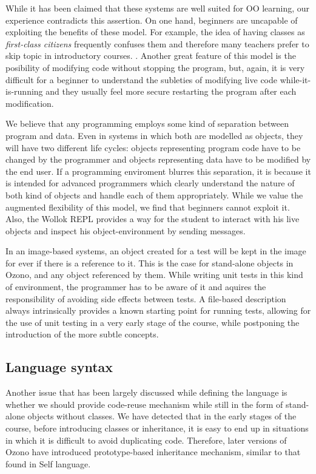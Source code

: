 While it has been claimed that these systems are well suited for OO learning, our experience contradicts this assertion.
On one hand, beginners are uncapable of exploiting the benefits of these model. 
For example, the idea of having classes as \emph{first-class citizens} frequently confuses them and therefore many teachers prefer to skip topic in introductory courses. .
Another great feature of this model is the posibility of modifying code without stopping the program, 
but, again, it is very difficult for a beginner to understand the subleties of modifying live code while-it-is-running 
and they usually feel more secure restarting the program after each modification.

We believe that any programming employs some kind of separation between program and data. 
Even in systems in which both are modelled as objects, they will have two different life cycles: 
objects representing program code have to be changed by the programmer
and objects representing data have to be modified by the end user.
If a programming enviroment blurres this separation, 
it is because it is intended for advanced programmers which clearly understand the nature of both kind of objects 
and handle each of them appropriately.
While we value the augmented flexibility of this model, we find that beginners cannot exploit it.
Also, the Wollok REPL provides a way for the student to interact with his live objects and inspect his object-environment by sending messages.

In an image-based systems, an object created for a test will be kept in the image for ever if there is a reference to it.
This is the case for stand-alone objects in Ozono, and any object referenced by them.
While writing unit tests in this kind of environment, the programmer has to be aware of it and aquires the responsibility of avoiding side effects between tests.
A file-based description always intrinsically provides a known starting point for running tests, 
allowing for the use of unit testing in a very early stage of the course,
while postponing the introduction of the more subtle concepts.

\subsection{Language syntax}
Another issue that has been largely discussed while defining the language 
is whether we should provide code-reuse mechanism while still in the form of stand-alone objects without classes.
We have detected that in the early stages of the course, before introducing classes or inheritance, 
it is easy to end up in situations in which it is difficult to avoid duplicating code.
Therefore, later versions of Ozono have introduced prototype-based inheritance mechanism, 
similar to that found in Self language\cite{Ungar87self:the, Ungar91organizingprograms}. 

